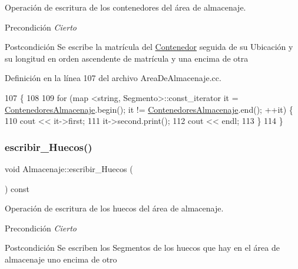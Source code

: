 Operación de escritura de los contenedores del área de almacenaje. 

\begin{DoxyPrecond}{Precondición}
{\itshape Cierto} 
\end{DoxyPrecond}
\begin{DoxyPostcond}{Postcondición}
Se escribe la matrícula del \hyperlink{class_contenedor}{Contenedor} seguida de su Ubicación y su longitud en orden ascendente de matrícula y una encima de otra 
\end{DoxyPostcond}


Definición en la línea 107 del archivo Area\+De\+Almacenaje.\+cc.


\begin{DoxyCode}
107                                                        \{
108     
109     \textcolor{keywordflow}{for} (map <string, Segmento>::const\_iterator it = \hyperlink{class_almacenaje_ab3cfe0feaf244094a7e2c5225ee681e6}{ContenedoresAlmacenaje}.begin(); 
      it != \hyperlink{class_almacenaje_ab3cfe0feaf244094a7e2c5225ee681e6}{ContenedoresAlmacenaje}.end(); ++it) \{
110         cout << it->first;
111         it->second.print();
112         cout << endl;
113     \}
114 \}
\end{DoxyCode}
\mbox{\label{class_almacenaje_a29e009f94265ea34b860f0918d3e1992}} 
\subsubsection{\texorpdfstring{escribir\+\_\+\+Huecos()}{escribir\_Huecos()}}
{\footnotesize\ttfamily void Almacenaje\+::escribir\+\_\+\+Huecos (\begin{DoxyParamCaption}{ }\end{DoxyParamCaption}) const}



Operación de escritura de los huecos del área de almacenaje. 

\begin{DoxyPrecond}{Precondición}
{\itshape Cierto} 
\end{DoxyPrecond}
\begin{DoxyPostcond}{Postcondición}
Se escriben los Segmentos de los huecos que hay en el área de almacenaje uno encima de otro 
\end{DoxyPostcond}



